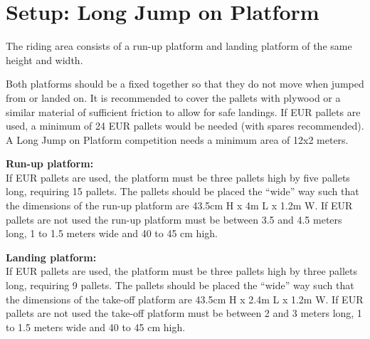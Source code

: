 \section{Setup: Long Jump on Platform}
The riding area consists of a run-up platform and landing platform of the same height and width.

Both platforms should be a fixed together so that they do not move when jumped from or landed on.
It is recommended to cover the pallets with plywood or a similar material of sufficient friction to allow for safe landings.
If EUR pallets are used, a minimum of 24 EUR pallets would be needed (with spares recommended).
A Long Jump on Platform competition needs a minimum area of 12x2 meters.

\textbf{Run-up platform:}\\
If EUR pallets are used, the platform must be three pallets high by five pallets long, requiring 15 pallets.
The pallets should be placed the ``wide'' way such that the dimensions of the run-up platform are 43.5cm H x 4m L x 1.2m W.
If EUR pallets are not used the run-up platform must be between 3.5 and 4.5 meters long, 1 to 1.5 meters wide and 40 to 45 cm high.

\textbf{Landing platform:}\\
If EUR pallets are used, the platform must be three pallets high by three pallets long, requiring 9 pallets.
The pallets should be placed the ``wide'' way such that the dimensions of the take-off platform are 43.5cm H x 2.4m L x 1.2m W.
If EUR pallets are not used the take-off platform must be between 2 and 3 meters long, 1 to 1.5 meters wide and 40 to 45 cm high.
